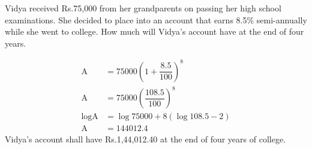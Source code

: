 
%
%
%
%
% 

\question[2] Vidya received Rs.75,000 from her grandparents on passing her high school examinations. She decided to place into an account that earns 8.5\% semi-annually while she went to college. How much will Vidya's account have at the end of four years.

\ifprintanswers
\fi 

\begin{solution}
	\begin{align}
			 \text{A} &= 75000\left(1 + \dfrac{8.5}{100}\right)^8 \\
			 \text{A} &= 75000\left(\dfrac{108.5}{100}\right)^8 \\			
		\log \text{A} &= \log 75000 + 8\left(\log 108.5 - 2\right) \\
			 \text{A} &= 144012.4	
	\end{align}
	Vidya's account shall have Rs.1,44,012.40 at the end of four years of college.
\end{solution}
